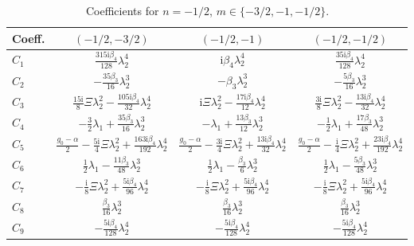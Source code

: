 \documentclass[11pt]{article}
\newcommand{\ii}{\mathrm{i}}
\begin{document}
\begin{table}[htbp]
\centering\small
\caption{Coefficients for $n=-1/2$, $m\in\{-3/2,-1,-1/2\}$.}
\begin{tabular}{lccc}
\toprule
Coeff. & $(-1/2,-3/2)$ & $(-1/2,-1)$ & $(-1/2,-1/2)$ \\
\midrule
$C_1$ & $\tfrac{315\ii\beta_4}{128}\lambda_2^4$ & $\ii\beta_4\lambda_2^4$ & $\tfrac{35\ii\beta_4}{128}\lambda_2^4$ \\
$C_2$ & $-\tfrac{35\beta_3}{16}\lambda_2^3$ & $-\beta_3\lambda_2^3$ & $-\tfrac{5\beta_3}{16}\lambda_2^3$ \\
$C_3$ & $\tfrac{15\ii}{8}\Xi\lambda_2^2-\tfrac{105\ii\beta_4}{32}\lambda_2^4$ & $\ii\Xi\lambda_2^2-\tfrac{17\ii\beta_4}{12}\lambda_2^4$ & $\tfrac{3\ii}{8}\Xi\lambda_2^2-\tfrac{13\ii\beta_4}{32}\lambda_2^4$ \\
$C_4$ & $-\tfrac32\lambda_1+\tfrac{35\beta_3}{16}\lambda_2^3$ & $-\lambda_1+\tfrac{13\beta_3}{12}\lambda_2^3$ & $-\tfrac12\lambda_1+\tfrac{17\beta_3}{48}\lambda_2^3$ \\
$C_5$ & $\tfrac{g_0-\alpha}{2}-\tfrac{5\ii}{4}\Xi\lambda_2^2+\tfrac{163\ii\beta_4}{192}\lambda_2^4$ & $\tfrac{g_0-\alpha}{2}-\tfrac{3\ii}{4}\Xi\lambda_2^2+\tfrac{13\ii\beta_4}{32}\lambda_2^4$ & $\tfrac{g_0-\alpha}{2}-\tfrac{\ii}{4}\Xi\lambda_2^2+\tfrac{23\ii\beta_4}{192}\lambda_2^4$ \\
$C_6$ & $\tfrac12\lambda_1-\tfrac{11\beta_3}{48}\lambda_2^3$ & $\tfrac12\lambda_1-\tfrac{\beta_3}{6}\lambda_2^3$ & $\tfrac12\lambda_1-\tfrac{5\beta_3}{48}\lambda_2^3$ \\
$C_7$ & $-\tfrac{\ii}{8}\Xi\lambda_2^2+\tfrac{5\ii\beta_4}{96}\lambda_2^4$ & $-\tfrac{\ii}{8}\Xi\lambda_2^2+\tfrac{5\ii\beta_4}{96}\lambda_2^4$ & $-\tfrac{\ii}{8}\Xi\lambda_2^2+\tfrac{5\ii\beta_4}{96}\lambda_2^4$ \\
$C_8$ & $\tfrac{\beta_3}{16}\lambda_2^3$ & $\tfrac{\beta_3}{16}\lambda_2^3$ & $\tfrac{\beta_3}{16}\lambda_2^3$ \\
$C_9$ & $-\tfrac{5\ii\beta_4}{128}\lambda_2^4$ & $-\tfrac{5\ii\beta_4}{128}\lambda_2^4$ & $-\tfrac{5\ii\beta_4}{128}\lambda_2^4$ \\
\bottomrule
\end{tabular}
\end{table}
\end{document}
